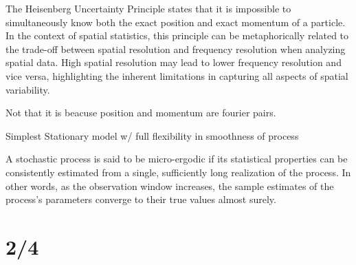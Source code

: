 \documentclass[answers,12pt,addpoints]{exam}
\begin{document}
\begin{remark}
    The Heisenberg Uncertainty Principle states that it is impossible to simultaneously know both the exact position and exact momentum of a particle. In the context of spatial statistics, this principle can be metaphorically related to the trade-off between spatial resolution and frequency resolution when analyzing spatial data. High spatial resolution may lead to lower frequency resolution and vice versa, highlighting the inherent limitations in capturing all aspects of spatial variability.

    Not that it is beacuse position and momentum are fourier pairs.
    
\end{remark}

\begin{definition}
    Simplest Stationary model w/ full flexibility in smoothness of process


\end{definition}

\begin{definition}
    A stochastic process is said to be micro-ergodic if its statistical properties can be consistently estimated from a single, sufficiently long realization of the process. In other words, as the observation window increases, the sample estimates of the process's parameters converge to their true values almost surely.
    
\end{definition}

\section{2/4}
\end{document}
